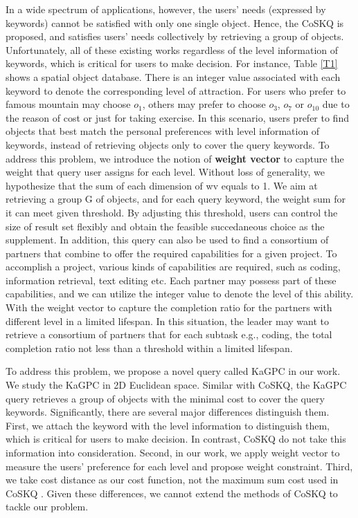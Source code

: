 In a wide spectrum of applications, however, the users' needs (expressed by keywords) cannot be satisfied with only one single object. Hence, the CoSKQ \cite{cao2011collective, long2013collective} is proposed, and satisfies users' needs collectively by retrieving a group of objects. Unfortunately, all of these existing works regardless of the level information of keywords, which is critical for users to make decision. For instance, Table \ref{T1} shows a spatial object database. There is an integer value associated with each keyword to denote the corresponding level of attraction. For users who prefer to famous mountain may choose $o_1$, others may prefer to choose $o_3$, $o_7$ or $o_{10}$ due to the reason of cost or just for taking exercise. In this scenario, users prefer to find objects that best match the personal preferences with level information of keywords, instead of retrieving objects only to cover the query keywords. To address this problem, we introduce the notion of \textbf{weight vector} to capture the weight that query user assigns for each level. Without loss of generality, we hypothesize that the sum of each dimension of wv equals to 1. We aim at retrieving a group G of objects, and for each query keyword, the weight sum for it can meet given threshold. By adjusting this threshold, users can control the size of result set flexibly and obtain the feasible succedaneous choice as the supplement. In addition, this query can also be used to find a consortium of partners that combine to offer the required capabilities for a given project. To accomplish a project, various kinds of capabilities are required, such as coding, information retrieval, text editing etc. Each partner may possess part of these capabilities, and we can utilize the integer value to denote the level of this ability. With the weight vector to capture the completion ratio for the partners with different level in a limited lifespan. In this situation, the leader may want to retrieve a consortium of partners that for each subtask e.g., coding, the total completion ratio not less than a threshold within a limited lifespan.

To address this problem, we propose a novel query called KaGPC in our work. We study the KaGPC in 2D Euclidean space. Similar with CoSKQ, the KaGPC query retrieves a group of objects with the minimal cost to cover the query keywords. Significantly, there are several major differences distinguish them. First, we attach the keyword with the level information to distinguish them, which is critical for users to make decision. In contrast, CoSKQ do not take this information into consideration. Second, in our work, we apply weight vector to measure the users' preference for each level and propose weight constraint. Third, we take cost distance as our cost function, not the maximum sum cost used in CoSKQ \cite{cao2011collective}. Given these differences, we cannot extend the methods of CoSKQ to tackle our problem.

